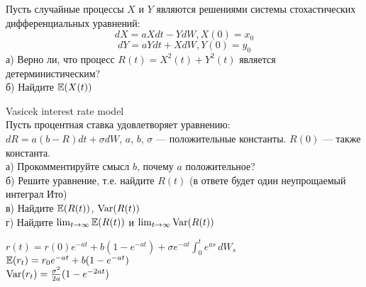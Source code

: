 \begin{problem}
Пусть случайные процессы $X$ и $Y$ являются решениями системы стохастических дифференциальных уравнений:
$$dX=aXdt-YdW, X(0)=x_{0}$$
$$dY=aYdt+XdW, Y(0)=y_{0}$$
а) Верно ли, что процесс $R(t)=X^{2}(t)+Y^{2}(t)$ является детерминистическим? \\
б) Найдите $\mathbb{E}(X(t))$ \\


\begin{sol}

\end{sol}
\end{problem}

\begin{problem}
 Vasicek interest rate model \\
Пусть процентная ставка удовлетворяет уравнению: \\
$dR=a(b-R)dt+\sigma dW$, $a$, $b$, $\sigma$ — положительные константы. $R(0)$ — также константа. \\
а) Прокомментируйте смысл $b$, почему $a$ положительное? \\
б) Решите уравнение, т.е. найдите $R(t)$ (в ответе будет один неупрощаемый интеграл Ито) \\
в) Найдите $\mathbb{E}(R(t))$, $\operatorname{Var}(R(t))$ \\
г) Найдите $\lim_{t\rightarrow\infty}\mathbb{E}(R(t))$ и $\lim_{t\rightarrow\infty}\operatorname{Var}(R(t))$

\begin{sol}


$ r(t) = r(0) e^{-a t} +  b \left(1- e^{-a t}\right) + \sigma e^{-a t}\int_0^t e^{a s}\,dW_s$ \\
$\mathbb{E}(r_t)=r_{0}e^{-at}+b(1-e^{-at})$ \\
$\operatorname{Var}(r_t) = \frac{\sigma^2}{2 a}(1 - e^{-2at})$
\end{sol}
\end{problem}

